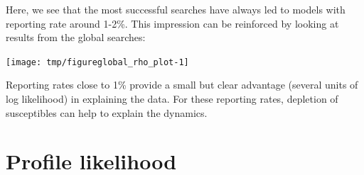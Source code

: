 \begin{frame}[fragile]

\bi

\item Here, we see that the most successful searches have always led to models with reporting rate around 1-2\%. This impression can be reinforced by looking at results from the global searches:

\ei

\begin{knitrout}\small
{}\color{fgcolor}\begin{kframe}
\begin{alltt}
\hlopt{~}\hlstd{=}\hlopt{>}\hlopt{$}\hlopt{-}\hlstd{),}\hlstd{=}\hlstd{)}
\end{alltt}
\end{kframe}
\end{knitrout}

\vspace{-2mm}

\begin{knitrout}\small
{}\color{fgcolor}

{\centering \texttt{[image: tmp/figureglobal\_rho\_plot-1]} 

}



\end{knitrout}



\bi

\item Reporting rates close to 1\% provide a small but clear advantage (several units of log likelihood) in explaining the data. For these reporting rates, depletion of susceptibles can help to explain the dynamics.

\ei

\end{frame}

\section{Profile likelihood}

